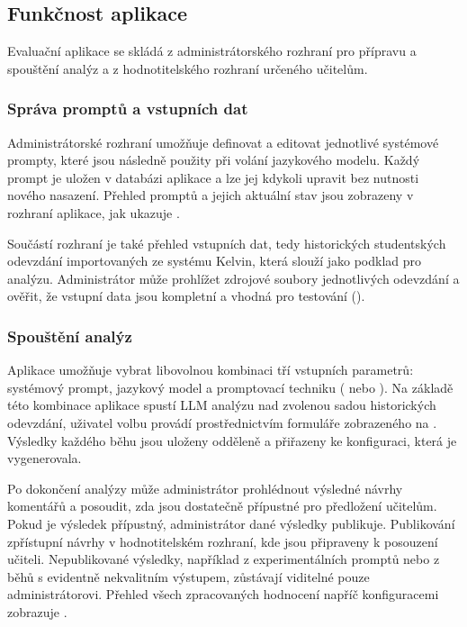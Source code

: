 \subsection{Funkčnost aplikace}
\label{subsec:implementation-tool-functionality}

Evaluační aplikace se skládá z administrátorského rozhraní pro přípravu a spouštění analýz a z hodnotitelského rozhraní určeného učitelům.

\subsubsection{Správa promptů a vstupních dat}
\label{subsubsec:implementation-tool-prompts}

Administrátorské rozhraní umožňuje definovat a editovat jednotlivé systémové prompty, které jsou následně použity při volání jazykového modelu.
Každý prompt je uložen v databázi aplikace a lze jej kdykoli upravit bez nutnosti nového nasazení.
Přehled promptů a jejich aktuální stav jsou zobrazeny v rozhraní aplikace, jak ukazuje .

Součástí rozhraní je také přehled vstupních dat, tedy historických studentských odevzdání importovaných ze systému Kelvin, která slouží jako podklad pro analýzu.
Administrátor může prohlížet zdrojové soubory jednotlivých odevzdání a ověřit, že vstupní data jsou kompletní a vhodná pro testování ().

\subsubsection{Spouštění analýz}
\label{subsubsec:implementation-tool-jobs}

Aplikace umožňuje vybrat libovolnou kombinaci tří vstupních parametrů: systémový prompt, jazykový model a promptovací techniku ( nebo ).
Na základě této kombinace aplikace spustí LLM analýzu nad zvolenou sadou historických odevzdání, uživatel volbu provádí prostřednictvím formuláře zobrazeného na .
Výsledky každého běhu jsou uloženy odděleně a přiřazeny ke konfiguraci, která je vygenerovala.

Po dokončení analýzy může administrátor prohlédnout výsledné návrhy komentářů a posoudit, zda jsou dostatečně přípustné pro předložení učitelům.
Pokud je výsledek přípustný, administrátor dané výsledky publikuje.
Publikování zpřístupní návrhy v hodnotitelském rozhraní, kde jsou připraveny k posouzení učiteli.
Nepublikované výsledky, například z experimentálních promptů nebo z běhů s evidentně nekvalitním výstupem, zůstávají viditelné pouze administrátorovi.
Přehled všech zpracovaných hodnocení napříč konfiguracemi zobrazuje .

